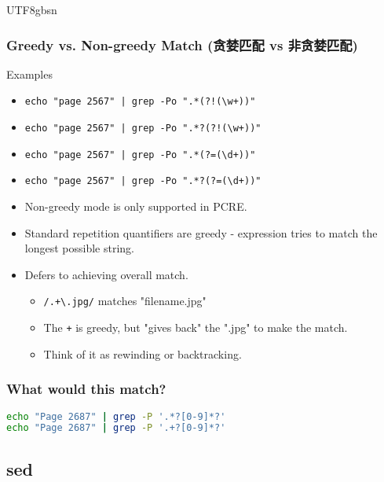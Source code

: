 \documentclass[red]{beamer}
\newcommand*{\lstverb}{\lstinline[style=caret]}
\begin{document}
\begin{CJK*}{UTF8}{gbsn}
\begin{frame}
\frametitle{Greedy vs. Non-greedy Match (贪婪匹配 vs 非贪婪匹配)}
\begin{block}{\centering\footnotesize Examples}
\begin{itemize}
	\item \lstinline{echo "page 2567" | grep -Po ".*(?!(\w+))"}
	\item \lstinline{echo "page 2567" | grep -Po ".*?(?!(\w+))"}
	\item \lstinline{echo "page 2567" | grep -Po ".*(?=(\d+))"}
	\item \lstinline{echo "page 2567" | grep -Po ".*?(?=(\d+))"}
\end{itemize}
\end{block}
\begin{itemize}
\footnotesize
	\item Non-greedy mode is only supported in PCRE.
	\item Standard repetition quantifiers are greedy - expression tries 
		to match the longest possible string.
	\item Defers to achieving overall match.
	\begin{itemize}
		\item \lstverb|/.+\.jpg/| matches "filename.jpg"
		\item The \lstverb|+| is greedy, but "gives back" the 
			".jpg" to make the match.
		\item Think of it as rewinding or backtracking.
	\end{itemize} 
\end{itemize}
\end{frame}


\begin{frame}
\frametitle{What would this match?}
\begin{lstlisting}[language=bash]
echo "Page 2687" | grep -P '.*?[0-9]*?'
echo "Page 2687" | grep -P '.+?[0-9]*?'
\end{lstlisting}
\end{frame}

\subsection{sed}


\end{CJK*}
\end{document}

